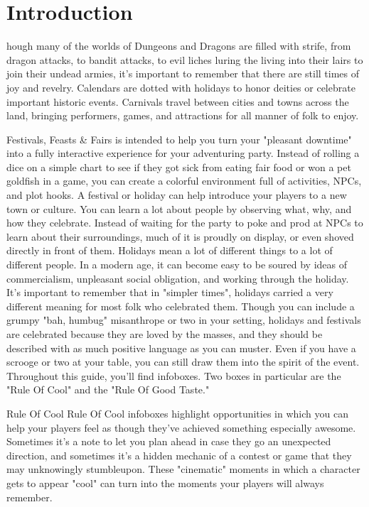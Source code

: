 \documentclass[10pt,a4paper,twoside,bg=print,twocolumn,openany,nodeprecatedcode]{dndbook}
\begin{document}
\tableofcontents
\newpage
{}
\chapter*{Introduction}
hough many of the worlds of Dungeons and Dragons are filled with strife, from dragon attacks, to bandit attacks, to evil liches luring the living into their lairs to join their undead armies, it's important to remember that there are still times of joy and revelry. Calendars are dotted with holidays to honor deities or celebrate important historic events. Carnivals travel between cities and towns across the land, bringing performers, games, and attractions for all manner of folk to enjoy.

Festivals, Feasts \& Fairs is intended to help you turn your "pleasant downtime" into a fully interactive experience for your adventuring party. Instead of rolling a dice on a simple chart to see if they got sick from eating fair food or won a pet goldfish in a game, you can create a colorful environment full of activities, NPCs, and plot hooks.
A festival or holiday can help introduce your players to a new town or culture. You can learn a lot about people by observing what, why, and how they celebrate. Instead of waiting for the party to poke and prod at NPCs to learn about their surroundings, much of it is proudly on display, or even shoved directly in front of them.
Holidays mean a lot of different things to a lot of different people. In a modern age, it can become easy to be soured by ideas of commercialism, unpleasant social obligation, and working through the holiday. It's important to remember that in "simpler times", holidays carried a very different meaning for most folk who celebrated them. Though you can include a grumpy "bah, humbug" misanthrope or two in your setting, holidays and festivals are celebrated because they are loved by the masses, and they should be described with as much positive language as you can muster. Even if you have a scrooge or two at your table, you can still draw them into the spirit of the event.
Throughout this guide, you'll find infoboxes. Two boxes in particular are the "Rule Of Cool" and the "Rule Of Good Taste."
\begin{DndSidebar}[float=!b]{Rule Of Cool}
Rule Of Cool infoboxes highlight opportunities in which you can help your players feel as though they've achieved something especially awesome. Sometimes it's a note to let you plan ahead in case they go an unexpected direction, and sometimes it's a hidden mechanic of a contest or game that they may unknowingly stumbleupon. These "cinematic" moments in which a character gets to appear "cool" can turn into the moments your players will always remember.


\end{DndSidebar}
\end{document}
